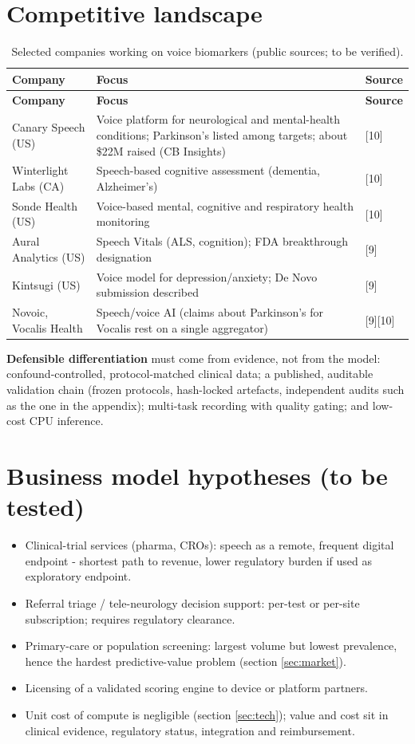 \documentclass[10pt,a4paper]{article}
\begin{document}
\section{Competitive landscape}\label{sec:competition}
\begin{center}\scriptsize\renewcommand{\arraystretch}{1.12}
\begin{longtable}{p{3.6cm}p{10.2cm}l}
\caption{Selected companies working on voice biomarkers (public sources; to be verified).}\\
\toprule
\textbf{Company} & \textbf{Focus} & \textbf{Source}\\\midrule\endfirsthead
\toprule
\textbf{Company} & \textbf{Focus} & \textbf{Source}\\\midrule\endhead
\bottomrule\endfoot
Canary Speech (US) & Voice platform for neurological and mental-health conditions; Parkinson's listed among targets; about \$22M raised (CB Insights) & [10]\\
Winterlight Labs (CA) & Speech-based cognitive assessment (dementia, Alzheimer's) & [10]\\
Sonde Health (US) & Voice-based mental, cognitive and respiratory health monitoring & [10]\\
Aural Analytics (US) & Speech Vitals (ALS, cognition); FDA breakthrough designation & [9]\\
Kintsugi (US) & Voice model for depression/anxiety; De Novo submission described & [9]\\
Novoic, Vocalis Health & Speech/voice AI (claims about Parkinson's for Vocalis rest on a single aggregator) & [9][10]\\
\end{longtable}\end{center}
\textbf{Defensible differentiation} must come from evidence, not from the model: confound-controlled, protocol-matched clinical data; a published, auditable validation chain (frozen protocols, hash-locked artefacts, independent audits such as the one in the appendix); multi-task recording with quality gating; and low-cost CPU inference.
\section{Business model hypotheses (to be tested)}\label{sec:business}
\begin{itemize}\item Clinical-trial services (pharma, CROs): speech as a remote, frequent digital endpoint - shortest path to revenue, lower regulatory burden if used as exploratory endpoint.
\item Referral triage / tele-neurology decision support: per-test or per-site subscription; requires regulatory clearance.
\item Primary-care or population screening: largest volume but lowest prevalence, hence the hardest predictive-value problem (section \ref{sec:market}).
\item Licensing of a validated scoring engine to device or platform partners.
\item Unit cost of compute is negligible (section \ref{sec:tech}); value and cost sit in clinical evidence, regulatory status, integration and reimbursement.
\end{itemize}
\end{document}
